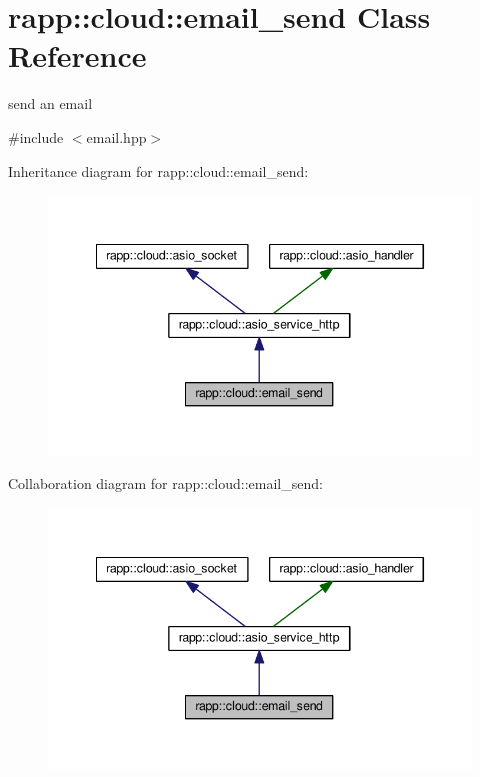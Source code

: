 \hypertarget{classrapp_1_1cloud_1_1email__send}{\section{rapp\-:\-:cloud\-:\-:email\-\_\-send Class Reference}
\label{classrapp_1_1cloud_1_1email__send}
}


send an email  




{\ttfamily \#include $<$email.\-hpp$>$}



Inheritance diagram for rapp\-:\-:cloud\-:\-:email\-\_\-send\-:
\nopagebreak
\begin{figure}[H]
\begin{center}
\leavevmode
\includegraphics[width=345pt]{classrapp_1_1cloud_1_1email__send__inherit__graph}
\end{center}
\end{figure}


Collaboration diagram for rapp\-:\-:cloud\-:\-:email\-\_\-send\-:
\nopagebreak
\begin{figure}[H]
\begin{center}
\leavevmode
\includegraphics[width=345pt]{classrapp_1_1cloud_1_1email__send__coll__graph}
\end{center}
\end{figure}
